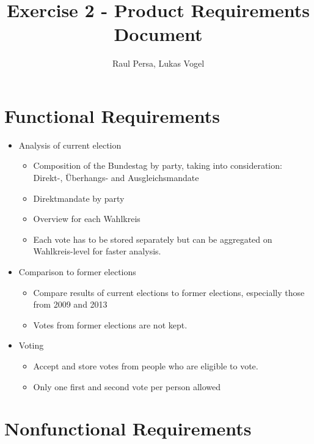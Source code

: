 \documentclass[10pt,a4paper]{article}
\author{Raul Persa, Lukas Vogel}
\title{Exercise 2 - Product Requirements Document}
\begin{document}
	\maketitle
	
	
	\section*{Functional Requirements}
	
	\begin{itemize}
		\item Analysis of current election
			\begin{itemize}
				\item Composition of the Bundestag by party, taking into consideration: Direkt-, \"Uberhangs- and Ausgleichsmandate
				\item Direktmandate by party
				\item Overview for each Wahlkreis
				\item Each vote has to be stored separately but can be aggregated on Wahlkreis-level for faster analysis.
			\end{itemize}
		\item Comparison to former elections
			\begin{itemize}
				\item Compare results of current elections to former elections, especially those from 2009 and 2013
				\item Votes from former elections are not kept.
			\end{itemize}
		\item Voting
			\begin{itemize}
				\item Accept and store votes from people who are eligible to vote.
				\item Only one first and second vote per person allowed
			\end{itemize}
	\end{itemize}
	
	\section*{Nonfunctional Requirements}
	
\end{document}
